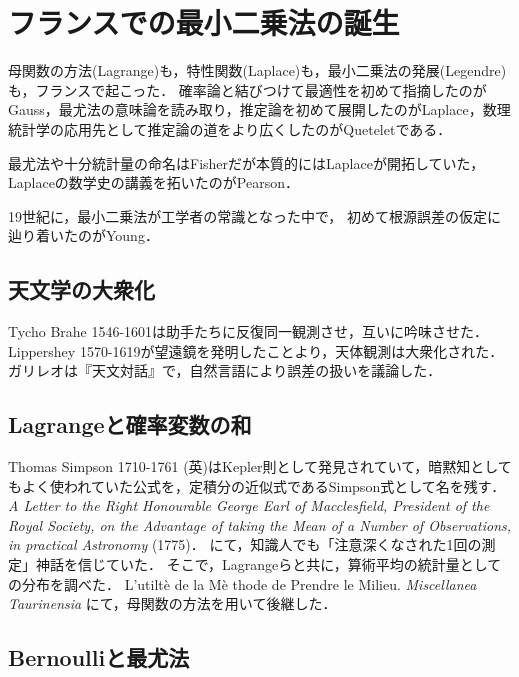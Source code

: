 \documentclass[uplatex,dvipdfmx]{jsreport}
\begin{document}
\section{フランスでの最小二乗法の誕生}

\begin{tcolorbox}[colframe=ForestGreen, colback=ForestGreen!10!white,breakable,colbacktitle=ForestGreen!40!white,coltitle=black,fonttitle=\bfseries\sffamily,
title=]
    母関数の方法(Lagrange)も，特性関数(Laplace)も，最小二乗法の発展(Legendre)も，フランスで起こった．
    確率論と結びつけて最適性を初めて指摘したのがGauss，最尤法の意味論を読み取り，推定論を初めて展開したのがLaplace，数理統計学の応用先として推定論の道をより広くしたのがQueteletである．

    最尤法や十分統計量の命名はFisherだが本質的にはLaplaceが開拓していた，Laplaceの数学史の講義を拓いたのがPearson．

    19世紀に，最小二乗法が工学者の常識となった中で，
    初めて根源誤差の仮定に辿り着いたのがYoung．
\end{tcolorbox}

\subsection{天文学の大衆化}

Tycho Brahe 1546-1601は助手たちに反復同一観測させ，互いに吟味させた．
Lippershey 1570-1619が望遠鏡を発明したことより，天体観測は大衆化された．
ガリレオは『天文対話』で，自然言語により誤差の扱いを議論した．

\subsection{Lagrangeと確率変数の和}

Thomas Simpson 1710-1761 (英)はKepler則として発見されていて，暗黙知としてもよく使われていた公式を，定積分の近似式であるSimpson式として名を残す．
\textit{A Letter to the Right Honourable George Earl of Macclesfield, President of the Royal Society, on the Advantage of taking the Mean of a Number of Observations, in practical Astronomy} (1775)．
にて，知識人でも「注意深くなされた1回の測定」神話を信じていた．
そこで，Lagrangeらと共に，算術平均の統計量としての分布を調べた．
L'utilt\`{e} de la M\`{e} thode de Prendre le Milieu.
\textit{Miscellanea Taurinensia}
にて，母関数の方法を用いて後継した．

\subsection{Bernoulliと最尤法}
\end{document}

